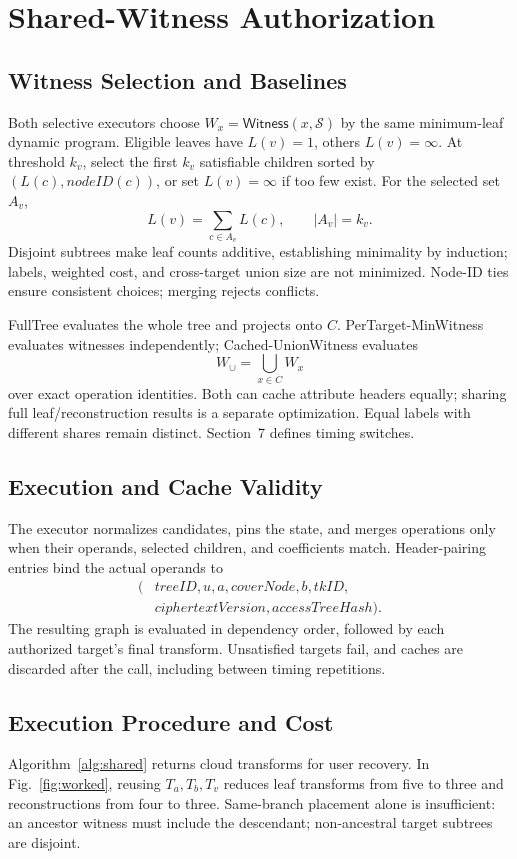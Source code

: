 \documentclass[runningheads]{llncs}
\newif\ifmarkrevisions
\newenvironment{revision}{\par\begingroup\ifmarkrevisions\color{RevisionBlue}\fi}{\par\endgroup}
\newcommand{\PolicyState}{\mathcal S}
\newcommand{\Witness}{\mathsf{Witness}}
\begin{document}
\section{Shared-Witness Authorization}
\begin{revision}
\subsection{Witness Selection and Baselines}
Both selective executors choose $W_x=\Witness(x,\PolicyState)$ by the same
minimum-leaf dynamic program. Eligible leaves have $L(v)=1$, others
$L(v)=\infty$. At threshold $k_v$, select the first $k_v$ satisfiable children
sorted by $(L(c),\mathit{nodeID}(c))$, or set $L(v)=\infty$ if too few exist.
For the selected set $A_v$,
\[
 L(v)=\sum_{c\in A_v}L(c),\qquad |A_v|=k_v.
\]
Disjoint subtrees make leaf counts additive, establishing minimality by
induction; labels, weighted cost, and cross-target union size are not
minimized. Node-ID ties ensure consistent choices; merging rejects conflicts.

FullTree evaluates the whole tree and projects onto $C$. PerTarget-MinWitness
evaluates witnesses independently; Cached-UnionWitness evaluates
\[
 W_{\cup}=\bigcup_{x\in C}W_x
\]
over exact operation identities. Both can cache attribute headers equally;
sharing full leaf/reconstruction results is a separate optimization. Equal
labels with different shares remain distinct. Section~7 defines timing switches.

\subsection{Execution and Cache Validity}
The executor normalizes candidates, pins the state, and merges operations only
when their operands, selected children, and coefficients match. Header-pairing
entries bind the actual operands to
\[
\begin{split}
(&\mathit{treeID},u,a,\mathit{coverNode},b,\mathit{tkID},\\
 &\mathit{ciphertextVersion},\mathit{accessTreeHash}).
\end{split}
\]
The resulting graph is evaluated in dependency order, followed by each
authorized target's final transform. Unsatisfied targets fail, and caches
are discarded after the call, including between timing repetitions.

\subsection{Execution Procedure and Cost}
Algorithm~\ref{alg:shared} returns cloud transforms for user recovery.
In Fig.~\ref{fig:worked}, reusing $T_a,T_b,T_v$ reduces leaf transforms from
five to three and reconstructions from four to three. Same-branch placement
alone is insufficient: an ancestor witness must include the descendant;
non-ancestral target subtrees are disjoint.


\end{revision}
\end{document}
